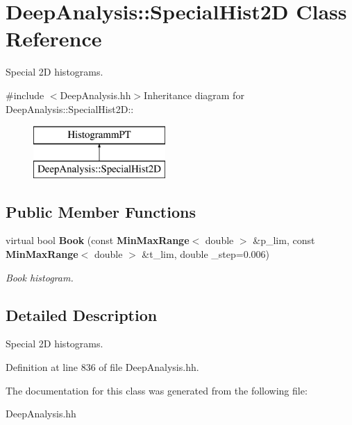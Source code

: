 \section{DeepAnalysis::SpecialHist2D Class Reference}
\label{classDeepAnalysis_1_1SpecialHist2D}


Special 2D histograms.  


{\ttfamily \#include $<$DeepAnalysis.hh$>$}Inheritance diagram for DeepAnalysis::SpecialHist2D::\begin{figure}[H]
\begin{center}
\leavevmode
\includegraphics[height=2cm]{classDeepAnalysis_1_1SpecialHist2D}
\end{center}
\end{figure}
\subsection*{Public Member Functions}
\begin{DoxyCompactItemize}
\item 
virtual bool {\bf Book} (const {\bf MinMaxRange}$<$ double $>$ \&p\_\-lim, const {\bf MinMaxRange}$<$ double $>$ \&t\_\-lim, double \_\-step=0.006)\label{classDeepAnalysis_1_1SpecialHist2D_a4e0ed25d3a28a50145c229cac8732836}

\begin{DoxyCompactList}\small\item\em Book histogram. \item\end{DoxyCompactList}\end{DoxyCompactItemize}


\subsection{Detailed Description}
Special 2D histograms. 

Definition at line 836 of file DeepAnalysis.hh.

The documentation for this class was generated from the following file:\begin{DoxyCompactItemize}
\item 
DeepAnalysis.hh\end{DoxyCompactItemize}
